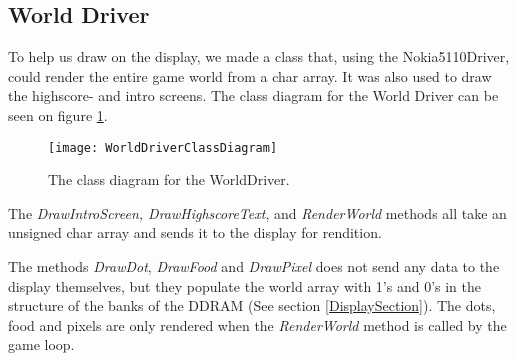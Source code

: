 \subsection{World Driver}
To help us draw on the display, we made a class that, using the Nokia5110Driver, could render the entire game world from a char array. It was also used to draw the highscore- and intro screens. The class diagram for the World Driver can be seen on figure \ref{WorldDriverClassDiagram}.

\begin{figure}[H]
	\texttt{[image: WorldDriverClassDiagram]}
	\centering
	\caption{The class diagram for the WorldDriver.}
	\label{WorldDriverClassDiagram}
\end{figure}

The \textit{DrawIntroScreen, DrawHighscoreText}, and \textit{RenderWorld} methods all take an unsigned char array and sends it to the display for rendition.

The methods \textit{DrawDot}, \textit{DrawFood} and \textit{DrawPixel} does not send any data to the display themselves, but they populate the world array with 1's and 0's in the structure of the banks of the DDRAM (See section \ref{DisplaySection}). The dots, food and pixels are only rendered when the \textit{RenderWorld} method is called by the game loop.